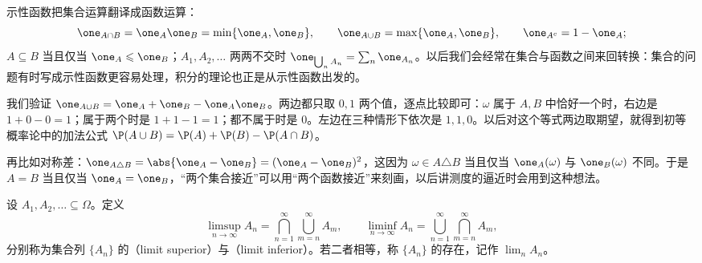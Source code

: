 示性函数把集合运算翻译成函数运算：
\[
\one_{A\cap B}=\one_A\one_B=\min\{\one_A,\one_B\},\qquad \one_{A\cup B}=\max\{\one_A,\one_B\},\qquad \one_{A^c}=1-\one_A;
\]
$A\subseteq B$ 当且仅当 $\one_A\leqslant\one_B$；$A_1,A_2,\dots$ 两两不交时 $\one_{\bigcup_nA_n}=\sum_n\one_{A_n}$。以后我们会经常在集合与函数之间来回转换：集合的问题有时写成示性函数更容易处理，积分的理论也正是从示性函数出发的。

\begin{example}[用示性函数验证集合等式]
我们验证 $\one_{A\cup B}=\one_A+\one_B-\one_A\one_B$。两边都只取 $0,1$ 两个值，逐点比较即可：$\omega$ 属于 $A,B$ 中恰好一个时，右边是 $1+0-0=1$；属于两个时是 $1+1-1=1$；都不属于时是 $0$。左边在三种情形下依次是 $1,1,0$。以后对这个等式两边取期望，就得到初等概率论中的加法公式 $\P(A\cup B)=\P(A)+\P(B)-\P(A\cap B)$。

再比如对称差：$\one_{A\triangle B}=\abs{\one_A-\one_B}=(\one_A-\one_B)^2$，这因为 $\omega\in A\triangle B$ 当且仅当 $\one_A(\omega)$ 与 $\one_B(\omega)$ 不同。于是 $A=B$ 当且仅当 $\one_A=\one_B$，“两个集合接近”可以用“两个函数接近”来刻画，以后讲测度的逼近时会用到这种想法。
\end{example}

\begin{definition}[集合列的上极限与下极限]\label{def:set-systems:limsup}
设 $A_1,A_2,\dots\subseteq\Omega$。定义
\[
\limsup_{n\to\infty}A_n=\bigcap_{n=1}^\infty\bigcup_{m=n}^\infty A_m,\qquad
\liminf_{n\to\infty}A_n=\bigcup_{n=1}^\infty\bigcap_{m=n}^\infty A_m,
\]
分别称为集合列 $\{A_n\}$ 的（limit superior）与（limit inferior）。若二者相等，称 $\{A_n\}$ 的存在，记作 $\lim_nA_n$。
\end{definition}

